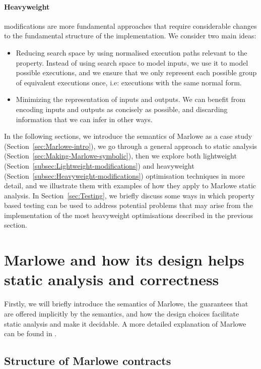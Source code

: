 \documentclass[english,runningheads]{llncs}
\begin{document}
\paragraph*{Heavyweight}

modifications are more fundamental approaches that require considerable
changes to the fundamental structure of the implementation. We consider
two main ideas:
\begin{itemize}
\item Reducing search space by using normalised execution paths relevant
to the property. Instead of using search space to model inputs, we
use it to model possible executions, and we ensure that we only
represent each possible group of equivalent executions once, i.e:
executions with the same normal form.
\item Minimizing the representation of inputs and outputs. We can benefit
from encoding inputs and outputs as concisely as possible, and discarding
information that we can infer in other ways.
\end{itemize}
In the following sections, we introduce the semantics of Marlowe as
a case study (Section~\ref{sec:Marlowe-intro}), we go through a
general approach to static analysis (Section~\ref{sec:Making-Marlowe-symbolic}),
then we explore both lightweight (Section~\ref{subsec:Lightweight-modifications})
and heavyweight (Section~\ref{subsec:Heavyweight-modifications})
optimisation techniques in more detail, and we illustrate them with
examples of how they apply to Marlowe static analysis. In Section~\ref{sec:Testing},
we briefly discuss some ways in which property based testing can be
used to address potential problems that may arise from the implementation
of the most heavyweight optimisations described in the previous section.

\section{Marlowe and how its design helps static analysis and correctness\label{sec:Marlowe-intro} }

Firstly, we will briefly introduce the semantics of Marlowe, the guarantees
that are offered implicitly by the semantics, and how the design choices
facilitate static analysis and make it decidable. A more detailed
explanation of Marlowe can be found in \cite{marlowe}.

\subsection{Structure of Marlowe contracts\label{subsec:Structure-of-Marlowe} }
\end{document}
